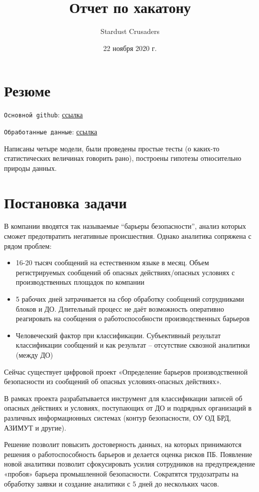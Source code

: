 \documentclass{article}
\title{Отчет по хакатону}
\author{Stardust Crusaders}
\date{22 ноября 2020 г.}
\begin{document}
\maketitle
\tableofcontents

\section*{Резюме}

\texttt{Основной github}: \href{https://github.com/Desiment/safety-barriers}{ссылка} 

\texttt{Обработанные данные}: \href{https://drive.google.com/drive/folders/1XhPnQkAMY1KkejASQoEDTFzi1GouzvbE?usp=sharing}{ссылка} 

Написаны четыре модели, были проведены простые тесты (о каких-то статистических величинах говорить рано), построены гипотезы относительно природы данных.

\newpage
\section{Постановка задачи}
В компании вводятся так называемые “барьеры безопасности”, анализ которых сможет предотвратить негативные происшествия. Однако аналитика сопряжена с рядом проблем:
\begin{itemize}
    \item 16-20 тысяч сообщений на естественном языке в месяц. Объем регистрируемых сообщений об опасных действиях/опасных условиях с производственных площадок по компании
    \item 5 рабочих дней затрачивается на сбор обработку сообщений сотрудниками блоков и ДО. Длительный процесс не даёт возможность оперативно реагировать на сообщения о работоспособности производственных барьеров
    \item Человеческий фактор при классификации. Субъективный результат классификации сообщений и как результат – отсутствие сквозной аналитики (между ДО)
\end{itemize}

Сейчас существует цифровой проект «Определение барьеров производственной безопасности из сообщений об опасных условиях-опасных действиях».

В рамках проекта разрабатывается инструмент для классификации записей об опасных действиях и условиях, поступающих от ДО и подрядных организаций в различных информационных системах (контур безопасности, ОУ ОД БРД, АЗИМУТ и другие).

Решение позволит повысить достоверность данных, на которых принимаются решения о работоспособность барьеров и делается оценка рисков ПБ.
Появление новой аналитики позволит сфокусировать усилия сотрудников на предупреждение «пробоя» барьера промышленной безопасности.
Сократятся трудозатраты на обработку заявки и создание аналитики с 5 дней до нескольких часов.
\end{document}
